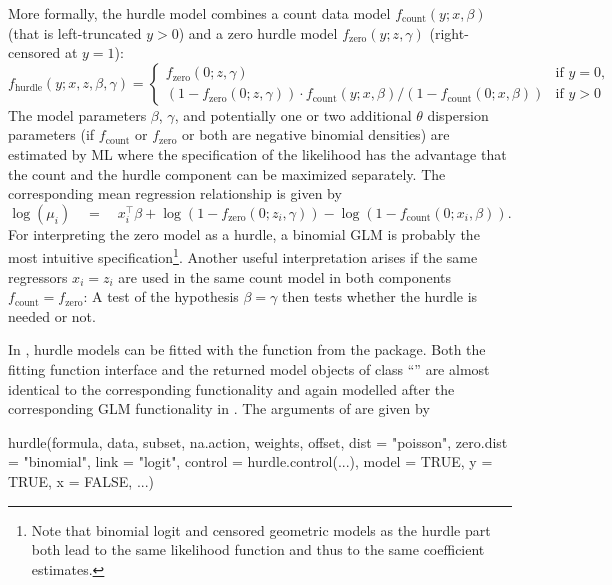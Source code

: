 \documentclass{Z}
\newcommand{\class}[1]{``\code{#1}''}
\newcommand{\fct}[1]{\code{#1()}}
\begin{document}
More formally, the hurdle model combines a count data model 
$f_\mathrm{count}(y; x, \beta)$ (that is left-truncated $y > 0$) and a 
zero hurdle model $f_\mathrm{zero}(y; z, \gamma)$ (right-censored at $y = 1$):
\begin{equation} \label{eq:hurdle}
f_\mathrm{hurdle}(y; x, z, \beta, \gamma) =
  \left\{
  \begin{array}{ll}
  f_\mathrm{zero}(0; z, \gamma) & \mbox{if } y = 0, \\
  (1 - f_\mathrm{zero}(0; z, \gamma)) \cdot
  f_\mathrm{count}(y; x, \beta)/(1 - f_\mathrm{count}(0; x, \beta)) & \mbox{if } y > 0
  \end{array}
  \right.
\end{equation}
The model parameters $\beta$, $\gamma$, and potentially one or two additional
$\theta$ dispersion parameters
(if $f_\mathrm{count}$ or $f_\mathrm{zero}$ or both are negative binomial densities)
are estimated by ML where the specification of the likelihood has the advantage that
the count and the hurdle component can be maximized separately. The corresponding
mean regression relationship is given by
\begin{equation} \label{eq:hurdle-mean}
\log(\mu_i) \quad = \quad x_i^\top \beta +
                    \log(1 - f_\mathrm{zero}(0; z_i, \gamma)) -
		    \log(1 - f_\mathrm{count}(0; x_i, \beta)).
\end{equation}
For interpreting the zero model as a hurdle, a binomial GLM is probably the most 
intuitive specification\footnote{Note that
binomial logit and censored geometric models as the hurdle part both lead to 
the same likelihood function and thus to the same coefficient estimates.}.
Another useful interpretation arises if the same regressors $x_i = z_i$ are
used in the same count model in both components $f_\mathrm{count} = f_\mathrm{zero}$: 
A test of the hypothesis $\beta = \gamma$ then tests whether the hurdle is
needed or not.

In , hurdle models can be fitted with the
\fct{hurdle} function from the  package. Both 
the fitting function interface and the returned model objects of class \class{hurdle}
are almost identical to the corresponding \fct{zeroinfl} functionality and again
modelled after the corresponding GLM functionality in . The
arguments of \fct{hurdle} are given by

\begin{Soutput}
hurdle(formula, data, subset, na.action, weights, offset,
  dist = "poisson", zero.dist = "binomial", link = "logit",
  control = hurdle.control(...),
  model = TRUE, y = TRUE, x = FALSE, ...)
\end{Soutput}
\end{document}
